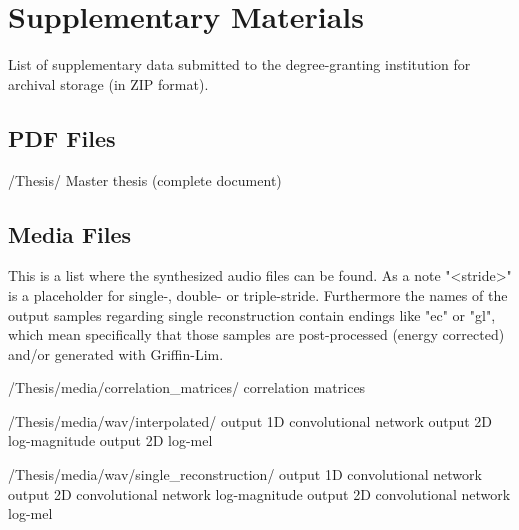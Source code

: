 \chapter{Supplementary Materials}
\label{app:materials}


List of supplementary data submitted to the degree-granting institution for archival storage
(in ZIP format).


\section{PDF Files}
\begin{FileList}{/Thesis/}
 Master thesis (complete document)
\end{FileList}

\section{Media Files}

This is a list where the synthesized audio files can be found. As a note "<stride>" is a placeholder for single-, double- or triple-stride. Furthermore the names of the output samples regarding single reconstruction contain endings like "ec" or "gl", which mean specifically that those samples are post-processed (energy corrected) and/or generated with Griffin-Lim.
\begin{FileList}{/Thesis/media/correlation_matrices/}
 correlation matrices
\end{FileList}

\begin{FileList}{/Thesis/media/wav/interpolated/}
 output 1D convolutional network
 output 2D log-magnitude
 output 2D log-mel
\end{FileList}

\begin{FileList}{/Thesis/media/wav/single_reconstruction/}
 output 1D convolutional network
 output 2D convolutional network log-magnitude
 output 2D convolutional network log-mel
    
\end{FileList}






